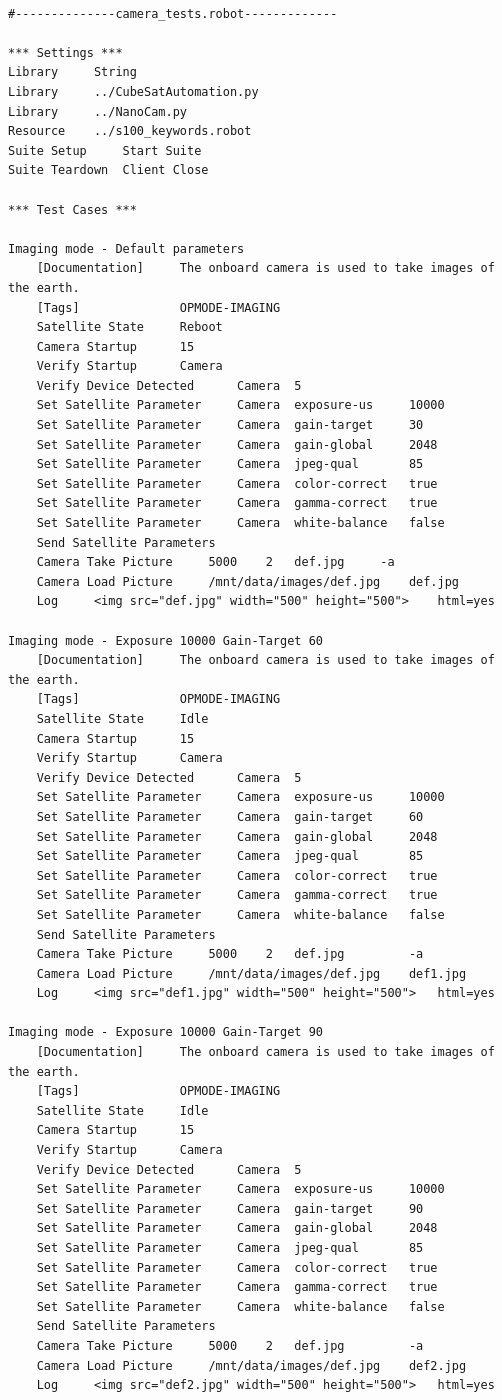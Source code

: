 \documentclass[english,12pt,a4paper,pdftex,elec,utf8]{aaltothesis}
\begin{document}
\begin{verbatim}

#--------------camera_tests.robot-------------

*** Settings ***
Library		String
Library		../CubeSatAutomation.py
Library		../NanoCam.py
Resource	../s100_keywords.robot
Suite Setup		Start Suite
Suite Teardown	Client Close

*** Test Cases ***

Imaging mode - Default parameters
	[Documentation] 	The onboard camera is used to take images of the earth.
	[Tags] 				OPMODE-IMAGING
	Satellite State 	Reboot
	Camera Startup		15
	Verify Startup 		Camera
	Verify Device Detected 		Camera 	5
	Set Satellite Parameter		Camera 	exposure-us 	10000
	Set Satellite Parameter		Camera 	gain-target 	30
	Set Satellite Parameter		Camera 	gain-global		2048
	Set Satellite Parameter		Camera 	jpeg-qual		85
	Set Satellite Parameter		Camera 	color-correct	true
	Set Satellite Parameter		Camera 	gamma-correct	true
	Set Satellite Parameter		Camera 	white-balance	false
	Send Satellite Parameters
	Camera Take Picture		5000	2	def.jpg 	-a
	Camera Load Picture		/mnt/data/images/def.jpg	def.jpg
	Log		<img src="def.jpg" width="500" height="500">	html=yes

Imaging mode - Exposure 10000 Gain-Target 60
	[Documentation]		The onboard camera is used to take images of the earth.
	[Tags]				OPMODE-IMAGING
	Satellite State		Idle
	Camera Startup		15
	Verify Startup		Camera
	Verify Device Detected		Camera 	5
	Set Satellite Parameter		Camera	exposure-us		10000
	Set Satellite Parameter		Camera	gain-target		60
	Set Satellite Parameter		Camera	gain-global		2048
	Set Satellite Parameter		Camera	jpeg-qual		85
	Set Satellite Parameter		Camera	color-correct	true
	Set Satellite Parameter		Camera	gamma-correct	true
	Set Satellite Parameter		Camera	white-balance	false
	Send Satellite Parameters
	Camera Take Picture		5000	2	def.jpg 		-a
	Camera Load Picture		/mnt/data/images/def.jpg	def1.jpg
	Log		<img src="def1.jpg" width="500" height="500">	html=yes

Imaging mode - Exposure 10000 Gain-Target 90
	[Documentation]		The onboard camera is used to take images of the earth.
	[Tags]				OPMODE-IMAGING
	Satellite State		Idle
	Camera Startup		15
	Verify Startup		Camera
	Verify Device Detected		Camera 	5
	Set Satellite Parameter		Camera	exposure-us		10000
	Set Satellite Parameter		Camera	gain-target		90
	Set Satellite Parameter		Camera	gain-global		2048
	Set Satellite Parameter		Camera	jpeg-qual		85
	Set Satellite Parameter		Camera	color-correct	true
	Set Satellite Parameter		Camera	gamma-correct	true
	Set Satellite Parameter		Camera	white-balance	false
	Send Satellite Parameters
	Camera Take Picture		5000	2	def.jpg 		-a
	Camera Load Picture		/mnt/data/images/def.jpg	def2.jpg
	Log		<img src="def2.jpg" width="500" height="500">	html=yes
	

\end{verbatim}
\end{document}
